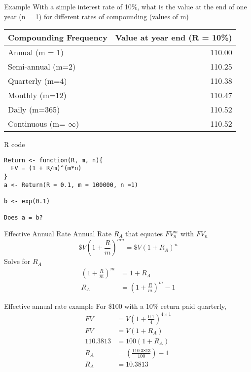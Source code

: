 \documentclass[14pt,xcolor=pdftex,dvipsnames,table]{beamer}
\begin{document}
\begin{frame}{Example}
With a simple interest rate of 10\%, what is the value at the end of one year (n = 1) for different rates of compounding (values of m)  
\begin{center}
 \begin{tabular}{l | r}
Compounding Frequency & Value at year end (R = 10\%)\\
\hline
Annual (m = 1) & 110.00\\
Semi-annual (m=2) & 110.25\\
Quarterly (m=4) & 110.38\\
Monthly (m=12) & 110.47\\
Daily (m=365) & 110.52\\
Continuous (m= $\infty$) & 110.52\\
\hline
\end{tabular}
\end{center}
\end{frame} 

\begin{frame}[fragile]{R code}
\begin{verbatim}
Return <- function(R, m, n){
  FV = (1 + R/m)^(m*n)
}
a <- Return(R = 0.1, m = 100000, n =1)

b <- exp(0.1)

Does a = b?
\end{verbatim}
\end{frame}

\begin{frame}{Effective Annual Rate}
Annual Rate $R_A$ that equates $FV_n^m$ with $FV_n$
\begin{equation}
\$V \left(1 + \frac{R}{m} \right)^{mn} = \$V(1+R_A)^n
\end{equation}
Solve for $R_A$
\begin{align}
\left(1+\frac{R}{m}\right)^m &= 1 + R_A \\
R_A &= \left(1+\frac{R}{m}\right)^m -1
\end{align}
\end{frame}

\begin{frame}{Effective annual rate example}
For \$100 with a 10\% return paid quarterly, 
\begin{align}
FV & = V \left (1 + \frac{0.1}{4} \right )^{4\times 1}\\
FV & = V (1 + R_A)\\ 
110.3813 & = 100(1 + R_A)\\
R_A & = \left (\frac{110.3813}{100} \right) -1\\ 
R_A & = 10.3813
\end{align}
\end{frame}
\end{document}
